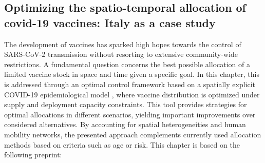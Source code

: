 \begin{fullwidth}
	\chapter[Optimizing the spatio-temporal allocation of  covid-19 vaccines: Italy as a case study]{Optimizing the spatio-temporal allocation of \\covid-19 vaccines: Italy as a case study}
\label{ch:covid-italy-ocp}

The development of vaccines has sparked high hopes towards the control of SARS-CoV-2 transmission without resorting to extensive community-wide restrictions. A fundamental question concerns the best possible allocation of a limited vaccine stock in space and time given a specific goal. In this chapter, this is addressed through an optimal control framework based on a spatially explicit COVID-19 epidemiological model \parencite{Bertuzzo:GeographyCOVID19Spread:2020,Gatto:SpreadDynamicsCOVID19:2020}, where vaccine distribution is optimized under supply and deployment capacity constraints. This tool provides strategies for optimal allocations in different scenarios, yielding important improvements over considered alternatives. By accounting for spatial heterogeneities and human mobility networks, the presented approach complements currently used allocation methods based on criteria such as age or risk.
This chapter is based on the following preprint: 


\end{fullwidth}
